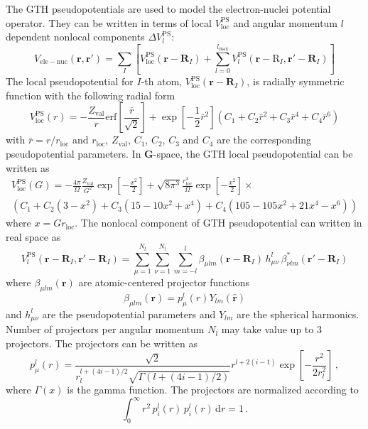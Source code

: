 The GTH pseudopotentials are used to model the electron-nuclei potential operator.
They can be written in terms of
local $V^{\mathrm{PS}}_{\mathrm{loc}}$ and
angular momentum $l$ dependent
nonlocal components $\Delta V^{\mathrm{PS}}_{l}$:
\begin{equation}
V_{\mathrm{ele-nuc}}(\mathbf{r},\mathbf{r}') =
\sum_{I} \left[
V^{\mathrm{PS}}_{\mathrm{loc}}(\mathbf{r}-\mathbf{R}_{I}) +
\sum_{l=0}^{l_{\mathrm{max}}}
V^{\mathrm{PS}}_{l}(\mathbf{r}-\mathrm{R}_{I},\mathbf{r}'-\mathbf{R}_{I})
\right]
\end{equation}
%
The local pseudopotential for
$I$-th atom, $V^{\mathrm{PS}}_{\mathrm{loc}}(\mathbf{r}-\mathbf{R}_{I})$,
is radially symmetric
function with the following radial form
\begin{equation}
V^{\mathrm{PS}}_{\mathrm{loc}}(r) =
-\frac{Z_{\mathrm{val}}}{r}\mathrm{erf}\left[
\frac{\bar{r}}{\sqrt{2}} \right] +
\exp\left[-\frac{1}{2}\bar{r}^2\right]\left(
C_{1} + C_{2}\bar{r}^2 + C_{3}\bar{r}^4 + C_{4}\bar{r}^6
\right)
\label{eq:V_ps_loc_R}
\end{equation}
%
with $\bar{r}=r/r_{\mathrm{loc}}$ and $r_{\mathrm{loc}}$, $Z_{\mathrm{val}}$,
$C_{1}$, $C_{2}$, $C_{3}$ and $C_{4}$ are the corresponding pseudopotential
parameters.
%
In $\mathbf{G}$-space, the GTH local pseudopotential can be written as
\begin{multline}
V^{\mathrm{PS}}_{\mathrm{loc}}(G) = -\frac{4\pi}{\Omega}\frac{Z_{\mathrm{val}}}{G^2}
\exp\left[-\frac{x^2}{2}\right] +
\sqrt{8\pi^3} \frac{r^{3}_{\mathrm{loc}}}{\Omega}\exp\left[-\frac{x^2}{2}\right]\times\\
\left( C_{1} + C_{2}(3 - x^2) + C_{3}(15 - 10x^2 + x^4) + C_{4}(105 - 105x^2 + 21x^4 - x^6) \right)
\label{eq:V_ps_loc_G}
\end{multline}
where $x=G r_{\mathrm{loc}}$.
%
The nonlocal component of GTH pseudopotential can written in real space as
\begin{equation}
V^{\mathrm{PS}}_{l}(\mathbf{r}-\mathbf{R}_{I},\mathbf{r}'-\mathbf{R}_{I}) =
\sum_{\mu=1}^{N_{l}} \sum_{\nu=1}^{N_{l}} \sum_{m=-l}^{l}
\beta_{\mu lm}(\mathbf{r}-\mathbf{R}_{I})\,
h^{l}_{\mu\nu}\,
\beta^{*}_{\nu lm}(\mathbf{r}'-\mathbf{R}_{I})
\end{equation}
where $\beta_{\mu lm}(\mathbf{r})$ are atomic-centered projector functions
\begin{equation}
\beta_{\mu lm}(\mathbf{r}) = 
p^{l}_{\mu}(r) Y_{lm}(\hat{\mathbf{r}})
\label{eq:betaNL_R}
\end{equation}
%
and $h^{l}_{\mu\nu}$ are the pseudopotential parameters and
$Y_{lm}$ are the spherical harmonics. Number of projectors per angular
momentum $N_{l}$ may take value up to 3 projectors.
The projectors can be written as
\begin{equation}
p^{l}_{\mu}(r) = \frac{\sqrt{2}}
{r^{l+(4i-1)/2}_{l}\sqrt{\Gamma(l + (4i-1)/2)}} r^{l+2(i-1)}
\exp\left[-\dfrac{r^2}{2r^{2}_{l}}\right] \, ,
\label{eq:proj_NL_R}
\end{equation}
where $\Gamma(x)$ is the gamma function. The projectors are normalized according
to
\begin{equation}
\int_{0}^{\infty} r^2\,p^{l}_{i}(r)\,p^{l}_{i}(r)\,\mathrm{d}r = 1 \, .
\end{equation}

